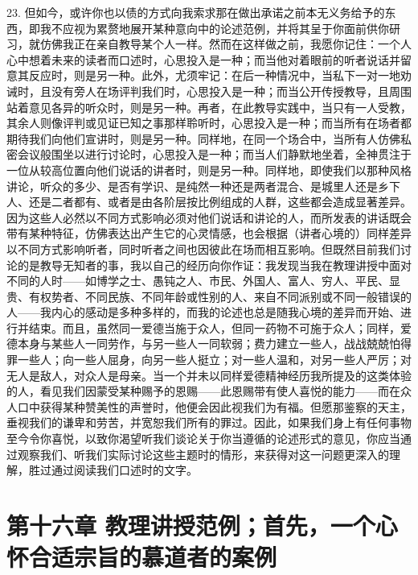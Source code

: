 23. 但如今，或许你也以债的方式向我索求那在做出承诺之前本无义务给予的东西，即我不应视为累赘地展开某种意向中的论述范例，并将其呈于你面前供你研习，就仿佛我正在亲自教导某个人一样。然而在这样做之前，我愿你记住：一个人心中想着未来的读者而口述时，心思投入是一种；而当他对着眼前的听者说话并留意其反应时，则是另一种。此外，尤须牢记：在后一种情况中，当私下一对一地劝诫时，且没有旁人在场评判我们时，心思投入是一种；而当公开传授教导，且周围站着意见各异的听众时，则是另一种。再者，在此教导实践中，当只有一人受教，其余人则像评判或见证已知之事那样聆听时，心思投入是一种；而当所有在场者都期待我们向他们宣讲时，则是另一种。同样地，在同一个场合中，当所有人仿佛私密会议般围坐以进行讨论时，心思投入是一种；而当人们静默地坐着，全神贯注于一位从较高位置向他们说话的讲者时，则是另一种。同样地，即使我们以那种风格讲论，听众的多少、是否有学识、是纯然一种还是两者混合、是城里人还是乡下人、还是二者都有、或者是由各阶层按比例组成的人群，这些都会造成显著差异。因为这些人必然以不同方式影响必须对他们说话和讲论的人，而所发表的讲话既会带有某种特征，仿佛表达出产生它的心灵情感，也会根据（讲者心境的）同样差异以不同方式影响听者，同时听者之间也因彼此在场而相互影响。但既然目前我们讨论的是教导无知者的事，我以自己的经历向你作证：我发现当我在教理讲授中面对不同的人时——如博学之士、愚钝之人、市民、外国人、富人、穷人、平民、显贵、有权势者、不同民族、不同年龄或性别的人、来自不同派别或不同一般错误的人——我内心的感动是多种多样的，而我的论述也总是随我心境的差异而开始、进行并结束。而且，虽然同一爱德当施于众人，但同一药物不可施于众人；同样，爱德本身与某些人一同劳作，与另一些人一同软弱；费力建立一些人，战战兢兢怕得罪一些人；向一些人屈身，向另一些人挺立；对一些人温和，对另一些人严厉；对无人是敌人，对众人是母亲。当一个并未以同样爱德精神经历我所提及的这类体验的人，看见我们因蒙受某种赐予的恩赐——此恩赐带有使人喜悦的能力——而在众人口中获得某种赞美性的声誉时，他便会因此视我们为有福。但愿那鉴察的天主，垂视我们的谦卑和劳苦，并宽恕我们所有的罪过。因此，如果我们身上有任何事物至今令你喜悦，以致你渴望听我们谈论关于你当遵循的论述形式的意见，你应当通过观察我们、听我们实际讨论这些主题时的情形，来获得对这一问题更深入的理解，胜过通过阅读我们口述时的文字。\par


\section{第十六章 教理讲授范例；首先，一个心怀合适宗旨的慕道者的案例}

